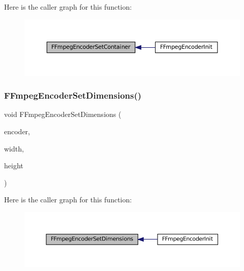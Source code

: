 Here is the caller graph for this function\+:
\nopagebreak
\begin{figure}[H]
\begin{center}
\leavevmode
\includegraphics[width=350pt]{ffmpeg-encoder_8c_abad277264801a7f376d166746514d683_icgraph}
\end{center}
\end{figure}
\mbox{\label{ffmpeg-encoder_8c_a1f4d9332a7d88280c90cde4bca269f79}} 
\subsubsection{\texorpdfstring{F\+Fmpeg\+Encoder\+Set\+Dimensions()}{FFmpegEncoderSetDimensions()}}
{\footnotesize\ttfamily void F\+Fmpeg\+Encoder\+Set\+Dimensions (\begin{DoxyParamCaption}\item[{struct \mbox{\hyperlink{ffmpeg-encoder_8h_struct_f_fmpeg_encoder}{F\+Fmpeg\+Encoder}} $\ast$}]{encoder,  }\item[{\mbox{\hyperlink{ioapi_8h_a787fa3cf048117ba7123753c1e74fcd6}{int}}}]{width,  }\item[{\mbox{\hyperlink{ioapi_8h_a787fa3cf048117ba7123753c1e74fcd6}{int}}}]{height }\end{DoxyParamCaption})}

Here is the caller graph for this function\+:
\nopagebreak
\begin{figure}[H]
\begin{center}
\leavevmode
\includegraphics[width=350pt]{ffmpeg-encoder_8c_a1f4d9332a7d88280c90cde4bca269f79_icgraph}
\end{center}
\end{figure}
\mbox{\label{ffmpeg-encoder_8c_a0812bb2471d9e5f5f220531bb1074798}} 
